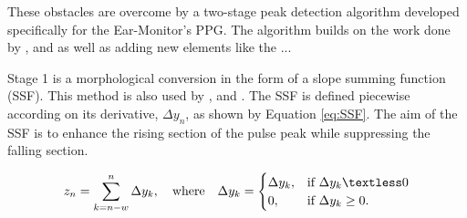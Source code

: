 \medskip

These obstacles are overcome by a two-stage peak detection algorithm developed specifically for the Ear-Monitor's PPG. The algorithm builds on the work done by \cite{park2015wearable}, \cite{zong2003open} and \cite{elgendi2013systolic} as well as adding new elements like the ...

\medskip

Stage 1 is a morphological conversion in the form of a slope summing function (SSF). This method is also used by \cite{zong2003open}, \cite{park2015wearable} and \cite{elgendi2013systolic}. The SSF is defined piecewise according on its derivative, $\Delta y_n$,  as shown by Equation \ref{eq:SSF}. The aim of the SSF is to enhance the rising section of the pulse peak while suppressing the falling section.

\begin{equation}
\label{eq:SSF}
z_n = \sum\limits_{k=n-w}^n \Delta y_k, \quad \text{where} \quad \Delta y_k=
\begin{cases}
\Delta y_k, 	&\text{if } \Delta y_k \textless	0 \\
0, 				&\text{if } \Delta y_k \geq			0. 
\end{cases}
\end{equation}